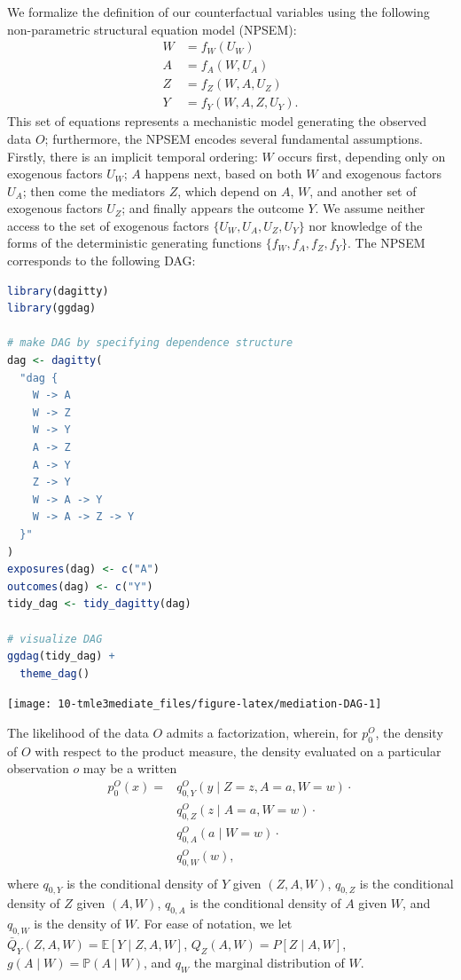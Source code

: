 \documentclass[
  12pt, krantz2,
]{krantz}
\theoremstyle{definition}
\theoremstyle{definition}
\theoremstyle{definition}
\renewcommand{\P}{\mathbb{P}}
\newcommand{\E}{\mathbb{E}}
\newcommand{\1}{\mathbbm{1}}
\begin{document}
We formalize the definition of our counterfactual variables using the following
non-parametric structural equation model (NPSEM):
\begin{align}
  W &= f_W(U_W) \\
  A &= f_A(W, U_A) \\
  Z &= f_Z(W, A, U_Z) \\
  Y &= f_Y(W, A, Z, U_Y).
  \label{eq:npsem-mediate}
\end{align}
This set of equations
represents a mechanistic model generating the observed data \(O\); furthermore,
the NPSEM encodes several fundamental assumptions. Firstly, there is an implicit
temporal ordering: \(W\) occurs first, depending only on exogenous factors \(U_W\);
\(A\) happens next, based on both \(W\) and exogenous factors \(U_A\); then come the
mediators \(Z\), which depend on \(A\), \(W\), and another set of exogenous factors
\(U_Z\); and finally appears the outcome \(Y\). We assume neither access to the set
of exogenous factors \(\{U_W, U_A, U_Z, U_Y\}\) nor knowledge of the forms of the
deterministic generating functions \(\{f_W, f_A, f_Z, f_Y\}\). The NPSEM
corresponds to the following DAG:

\begin{lstlisting}[language=R]
library(dagitty)
library(ggdag)

# make DAG by specifying dependence structure
dag <- dagitty(
  "dag {
    W -> A
    W -> Z
    W -> Y
    A -> Z
    A -> Y
    Z -> Y
    W -> A -> Y
    W -> A -> Z -> Y
  }"
)
exposures(dag) <- c("A")
outcomes(dag) <- c("Y")
tidy_dag <- tidy_dagitty(dag)

# visualize DAG
ggdag(tidy_dag) +
  theme_dag()
\end{lstlisting}

\begin{center}\texttt{[image: 10-tmle3mediate\_files/figure-latex/mediation-DAG-1]} \end{center}

The likelihood of the data \(O\) admits a factorization, wherein, for \(p_0^O\),
the density of \(O\) with respect to the product measure, the density evaluated
on a particular observation \(o\) may be a written
\begin{align}
  p_0^O(x) = &q^O_{0,Y}(y \mid Z = z, A = a, W = w) \cdot \\
    &q^O_{0,Z}(z \mid A = a, W = w) \cdot \\
    &q^O_{0,A}(a \mid W = w) \cdot \\
    &q^O_{0,W}(w),\\
  \label{eq:likelihood-factorization-mediate}
\end{align}
where \(q_{0, Y}\) is the conditional density of \(Y\) given \((Z, A, W)\), \(q_{0, Z}\)
is the conditional density of \(Z\) given \((A, W)\), \(q_{0, A}\) is the conditional
density of \(A\) given \(W\), and \(q_{0, W}\) is the density of \(W\). For ease of
notation, we let \(\bar{Q}_Y(Z, A, W) = \E[Y \mid Z, A, W]\), \(Q_Z(A, W) = P[Z \mid A, W]\), \(g(A \mid W) = \P(A \mid W)\), and \(q_W\) the marginal
distribution of \(W\).
\end{document}
